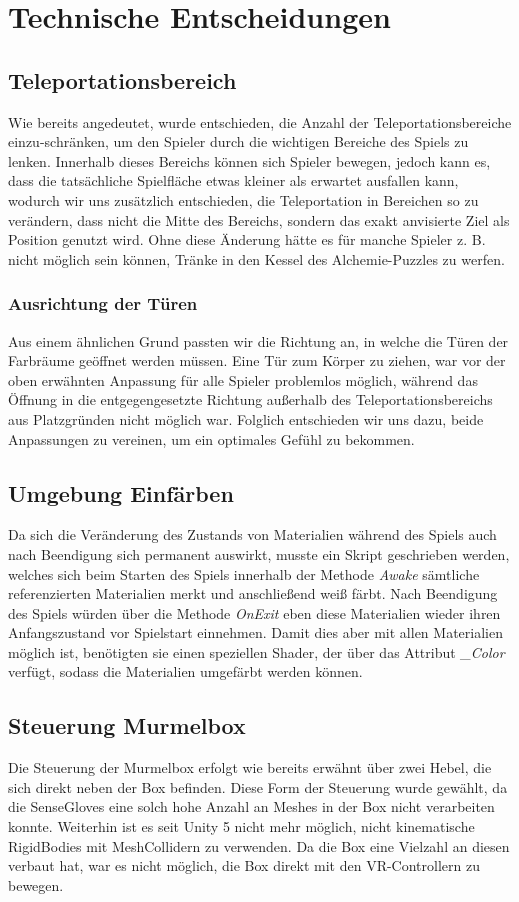 \section{Technische Entscheidungen}
\subsection{Teleportationsbereich}
Wie bereits angedeutet, wurde entschieden, die Anzahl der Teleportationsbereiche einzu-schränken, um den Spieler durch die wichtigen Bereiche des Spiels zu lenken. Innerhalb dieses Bereichs können sich Spieler bewegen, jedoch kann es, dass die tatsächliche Spielfläche etwas kleiner als erwartet ausfallen kann, wodurch wir uns zusätzlich entschieden, die Teleportation in Bereichen so zu verändern, dass nicht die Mitte des Bereichs, sondern das exakt anvisierte Ziel als Position genutzt wird. Ohne diese Änderung hätte es für manche Spieler z. B. nicht möglich sein können, Tränke in den Kessel des Alchemie-Puzzles zu werfen.
\subsubsection{Ausrichtung der Türen}
Aus einem ähnlichen Grund passten wir die Richtung an, in welche die Türen der Farbräume geöffnet werden müssen. Eine Tür zum Körper zu ziehen, war vor der oben erwähnten Anpassung für alle Spieler problemlos möglich, während das Öffnung in die entgegengesetzte Richtung außerhalb des Teleportationsbereichs aus Platzgründen nicht möglich war. Folglich entschieden wir uns dazu, beide Anpassungen zu vereinen, um ein optimales Gefühl zu bekommen.
\subsection{Umgebung Einfärben}
Da sich die Veränderung des Zustands von Materialien während des Spiels auch nach Beendigung sich permanent auswirkt, musste ein Skript geschrieben werden, welches sich beim Starten des Spiels innerhalb der Methode \textit{Awake} sämtliche referenzierten Materialien merkt und anschließend weiß färbt. Nach Beendigung des Spiels würden über die Methode \textit{OnExit} eben diese Materialien wieder ihren Anfangszustand vor Spielstart einnehmen. Damit dies aber mit allen Materialien möglich ist, benötigten sie einen speziellen Shader, der über das Attribut \textit{\_Color} verfügt, sodass die Materialien umgefärbt werden können.
\subsection{Steuerung Murmelbox}
Die Steuerung der Murmelbox erfolgt wie bereits erwähnt über zwei Hebel, die sich direkt neben der Box befinden. Diese Form der Steuerung wurde gewählt, da die SenseGloves eine solch hohe Anzahl an Meshes in der Box nicht verarbeiten konnte. Weiterhin ist es seit Unity 5 nicht mehr möglich, nicht kinematische RigidBodies mit MeshCollidern zu verwenden. Da die Box eine Vielzahl an diesen verbaut hat, war es nicht möglich, die Box direkt mit den VR-Controllern zu bewegen.
